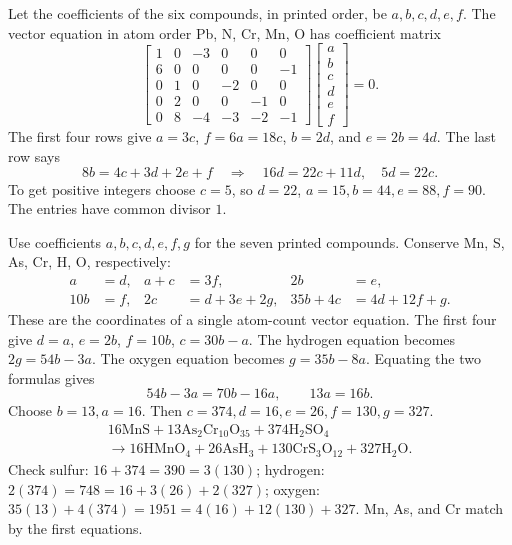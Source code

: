Let the coefficients of the six compounds, in printed order, be
$a,b,c,d,e,f$. The vector equation in atom order Pb, N, Cr, Mn, O
has coefficient matrix
\[\begin{bmatrix}
1&0&-3&0&0&0\\6&0&0&0&0&-1\\0&1&0&-2&0&0\\
0&2&0&0&-1&0\\0&8&-4&-3&-2&-1
\end{bmatrix}\begin{bmatrix}a\\b\\c\\d\\e\\f\end{bmatrix}=0.\]
The first four rows give $a=3c$, $f=6a=18c$, $b=2d$,
and $e=2b=4d$. The last row says
\[8b=4c+3d+2e+f\quad\Longrightarrow\quad16d=22c+11d,
\quad5d=22c.\]
To get positive integers choose $c=5$, so $d=22$,
$a=15,b=44,e=88,f=90$. The entries have common divisor $1$.

Use coefficients $a,b,c,d,e,f,g$ for the seven printed compounds.
Conserve Mn, S, As, Cr, H, O, respectively:
\begin{align*}
a&=d,&a+c&=3f,&2b&=e,\\
10b&=f,&2c&=d+3e+2g,&35b+4c&=4d+12f+g.
\end{align*}
These are the coordinates of a single atom-count vector equation.
The first four give $d=a$, $e=2b$, $f=10b$, $c=30b-a$.
The hydrogen equation becomes
$2g=54b-3a$. The oxygen equation becomes
$g=35b-8a$. Equating the two formulas gives
\[54b-3a=70b-16a,\qquad13a=16b.\]
Choose $b=13,a=16$. Then
$c=374,d=16,e=26,f=130,g=327$.
\begin{multline*}
16\mathrm{MnS}+13\mathrm{As}_2\mathrm{Cr}_{10}\mathrm O_{35}
+374\mathrm H_2\mathrm{SO}_4\\
\longrightarrow16\mathrm{HMnO}_4+26\mathrm{AsH}_3
+130\mathrm{CrS}_3\mathrm O_{12}+327\mathrm H_2\mathrm O.
\end{multline*}
Check sulfur: $16+374=390=3(130)$; hydrogen:
$2(374)=748=16+3(26)+2(327)$; oxygen:
$35(13)+4(374)=1951=4(16)+12(130)+327$.
Mn, As, and Cr match by the first equations.

